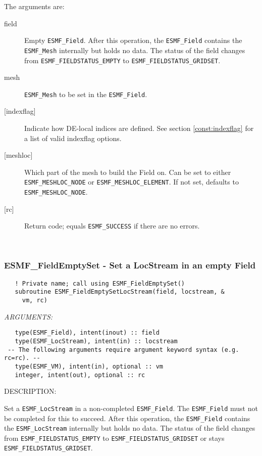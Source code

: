   
   The arguments are:
   \begin{description}
   \item [field]
   Empty {\tt ESMF\_Field}. After this
   operation, the {\tt ESMF\_Field} contains
   the {\tt ESMF\_Mesh} internally but holds no data.
   The status of the field changes from
   {\tt ESMF\_FIELDSTATUS\_EMPTY} to {\tt ESMF\_FIELDSTATUS\_GRIDSET}.
   \item [mesh]
   {\tt ESMF\_Mesh} to be set in the {\tt ESMF\_Field}.
   \item [{[indexflag]}]
   Indicate how DE-local indices are defined. See section
   \ref{const:indexflag} for a list of valid indexflag options.
   \item [{[meshloc]}]
   \begin{sloppypar}
   Which part of the mesh to build the Field on. Can be set to either
   {\tt ESMF\_MESHLOC\_NODE} or {\tt ESMF\_MESHLOC\_ELEMENT}. If not set,
   defaults to {\tt ESMF\_MESHLOC\_NODE}.
   \end{sloppypar}
   \item [{[rc]}]
   Return code; equals {\tt ESMF\_SUCCESS} if there are no errors.
   \end{description}
   
 
\mbox{}\hrulefill\ 
 
\subsubsection [ESMF\_FieldEmptySet] {ESMF\_FieldEmptySet - Set a LocStream in an empty Field}


\begin{verbatim}   ! Private name; call using ESMF_FieldEmptySet()
   subroutine ESMF_FieldEmptySetLocStream(field, locstream, &
     vm, rc)\end{verbatim}{\em ARGUMENTS:}
\begin{verbatim}   type(ESMF_Field), intent(inout) :: field
   type(ESMF_LocStream), intent(in) :: locstream
 -- The following arguments require argument keyword syntax (e.g. rc=rc). --
   type(ESMF_VM), intent(in), optional :: vm
   integer, intent(out), optional :: rc\end{verbatim}
{\sf DESCRIPTION:\\ }


   \begin{sloppypar}
   Set a {\tt ESMF\_LocStream} in a non-completed {\tt ESMF\_Field}. The
   {\tt ESMF\_Field} must not be completed for this to succeed. After this
   operation, the {\tt ESMF\_Field} contains
   the {\tt ESMF\_LocStream} internally but holds no data.
   The status of the field changes from
   {\tt ESMF\_FIELDSTATUS\_EMPTY} to {\tt ESMF\_FIELDSTATUS\_GRIDSET} or
   stays {\tt ESMF\_FIELDSTATUS\_GRIDSET}.
  
   \end{sloppypar}
  
